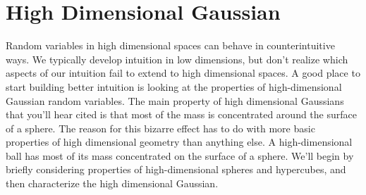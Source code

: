 \documentclass{book}
\begin{document}
\section{High Dimensional Gaussian }
Random variables in high dimensional spaces can behave in counterintuitive ways. We typically develop intuition in low dimensions, but don't realize which aspects of our intuition fail to extend to high dimensional spaces. A good place to start building better intuition is looking at the properties of high-dimensional Gaussian random variables. The main property of high dimensional Gaussians that you'll hear cited is that most of the mass is concentrated around the surface of a sphere. The reason for this bizarre effect has to do with more basic properties of high dimensional geometry than anything else. A high-dimensional ball has most of its mass concentrated on the surface of a sphere. We'll begin by briefly considering properties of high-dimensional spheres and hypercubes, and then characterize the high dimensional Gaussian. 
\end{document}
